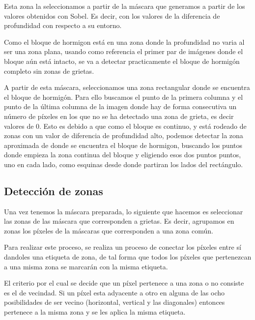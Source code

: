 Esta zona la seleccionamos a partir de la máscara que generamos a partir de los valores obtenidos con Sobel. Es decir, con los valores de la diferencia de profundidad con respecto a su entorno.

Como el bloque de hormigon está en una zona donde la profundidad no varia al ser una zona plana, usando como referencia el primer par de imágenes donde el bloque aún está intacto, se va a detectar practicamente el bloque de hormigón completo sin zonas de grietas. 

A partir de esta máscara, seleccionamos una zona rectangular donde se encuentra el bloque de hormigón. Para ello buscamos el punto de la primera columna y el punto de la última columna de la imagen donde hay de forma consecutiva un número de píxeles en los que no se ha detectado una zona de grieta, es decir valores de 0. Esto es debido a que como el bloque es continuo, y está rodeado de zonas con un valor de diferencia de profundidad alto, podemos detectar la zona aproximada de donde se encuentra el bloque de hormigon, buscando los puntos donde empieza la zona continua del bloque y eligiendo esos dos puntos puntos, uno en cada lado, como esquinas desde donde partiran los lados del rectángulo.



\subsection{Detección de zonas}
Una vez tenemos la máscara preparada, lo siguiente que hacemos es seleccionar las zonas de las máscara que corresponden a grietas. Es decir, agrupamos en zonas los píxeles de la máscaras que corresponden a una zona común.

Para realizar este proceso, se realiza un proceso de conectar los píxeles entre sí dandoles una etiqueta de zona, de tal forma que todos los píxeles que pertenezcan a una misma zona se marcarán con la misma etiqueta.

El criterio por el cual se decide que un píxel pertenece a una zona o no consiste es el de vecindad. Si un píxel esta adyacente a otro en alguna de las ocho posibilidades de ser vecino (horizontal, vertical y las diagonales) entonces pertenece a la misma zona y se les aplica la misma etiqueta.

